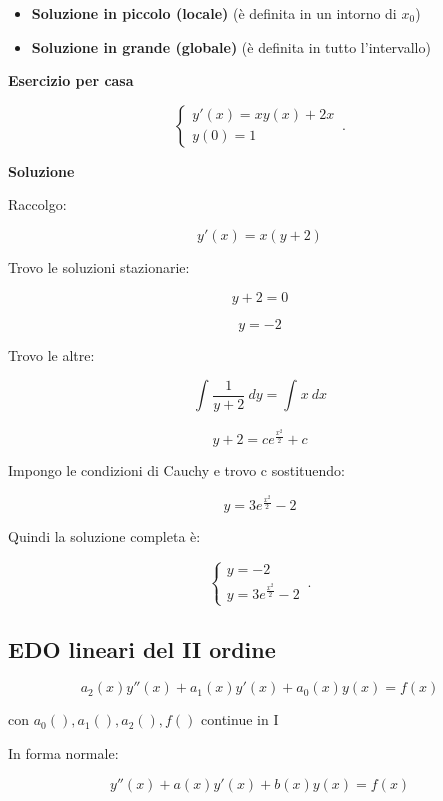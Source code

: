 \documentclass[../appunti-analisi.tex]{subfiles}
\begin{document}
\begin{itemize}
    \item \textbf{ Soluzione in piccolo (locale) } (è definita in un intorno di $x_0$)
    \item \textbf{ Soluzione in grande (globale) } (è definita in tutto l'intervallo)
\end{itemize}

\textbf{Esercizio per casa}

\begin{equation}
    \begin{cases}
      y'(x) = xy(x)+2x\\
      y(0) = 1
    \end{cases}\,.
\end{equation}

\textbf{Soluzione} 

Raccolgo: 

\[
    y'(x)=x(y+2)
\]

Trovo le soluzioni stazionarie:

\[
    y+2=0
\]

\[
    y=-2
\]

Trovo le altre:

\[
    \int_{}^{} {\frac{1}{y+2}} \: dy = \int_{}^{} {x} \: dx 
\]

\[
    y+2 = c e ^{ \frac{x^{2}}{2}}+c
\]

Impongo le condizioni di Cauchy e trovo c sostituendo:

\[
    y=3e ^{ \frac{x^{2}}{2}}-2
\]

Quindi la soluzione completa è:

    \begin{equation}
        \begin{cases}
            y=-2\\
            y=3e ^{ \frac{x^{2}}{2}}-2
        \end{cases}\,.
    \end{equation}



\subsection{EDO lineari del II ordine}

\[
    a_2(x)y''(x) + a_1(x) y'(x) + a_0(x) y(x) = f(x)
\]

con $a_0(),a_1(),a_2(),f()$ continue in I

In forma normale:

\[
    y''(x) + a(x) y'(x) + b(x)y(x) = f(x)
\]
\end{document}
